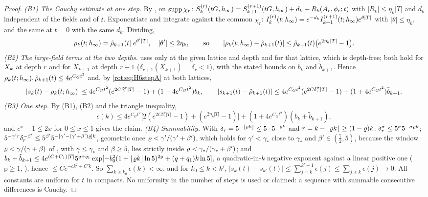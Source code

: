 \begin{proof}
\emph{(B1) The Cauchy estimate at one step.} By , on $\operatorname{supp}\chi_r$: $S^{(r)}_k(tG,h_\infty)=S^{(r+1)}_{k+1}(tG,h_\infty)+d_k+R_k(A_r,\phi_r;t)$ with $|R_k|\le\eta_k|T|$ and $d_k$ independent of the fields and of $t$. Exponentiate and integrate against the common $\chi_r$: $I^{(r)}_k(t;h_\infty)=e^{-d_k}I^{(r+1)}_{k+1}(t;h_\infty)e^{\theta|T|}$ with $|\theta|\le\eta_k$, and the same at $t=0$ with the same $d_k$. Dividing,
\[
\rho_k(t;h_\infty)=\tilde\rho_{k+1}(t)\,e^{\theta'|T|},\quad|\theta'|\le2\eta_k,\qquad\text{so}\qquad|\rho_k(t;h_\infty)-\tilde\rho_{k+1}(t)|\le\tilde\rho_{k+1}(t)\big(e^{2\eta_k|T|}-1\big).
\]
\emph{(B2) The large-field terms at the two depths.}  uses only  at the given lattice and depth and  for that lattice, which is depth-free; both hold for $X_k$ at depth $r$ and for $X_{k+1}$ at depth $r+1$ ($\delta_{r+1}(X_{k+1})=\delta_r<1$), with the stated bounds on $b_k$ and $\tilde b_{k+1}$. Hence $\rho_k(t;h_\infty),\tilde\rho_{k+1}(t)\le4e^{C_Gt^2}$ and, by \eqref{rot:eq:H6stepA} at both lattices,
\[
|s_k(t)-\rho_k(t;h_\infty)|\le4e^{C_Gt^2}(e^{2C\delta_r^\sigma|T|}-1)+(1+4e^{C_Gt^2})b_k,\qquad
|s_{k+1}(t)-\tilde\rho_{k+1}(t)|\le4e^{C_Gt^2}(e^{2C\delta_r^\sigma|T|}-1)+(1+4e^{C_Gt^2})\tilde b_{k+1}.
\]
\emph{(B3) One step.} By (B1), (B2) and the triangle inequality,
\[
\epsilon(k)\le4e^{C_Gt^2}\big[2(e^{2C\delta_r^\sigma|T|}-1)+(e^{2\eta_k|T|}-1)\big]+(1+4e^{C_Gt^2})(b_k+\tilde b_{k+1}),
\]
and $e^x-1\le2x$ for $0\le x\le1$ gives the claim.
\emph{(B4) Summability.} With $\delta_r=5^{-\lfloor\varrho k\rfloor}\le5\cdot5^{-\varrho k}$ and $r=k-\lfloor\varrho k\rfloor\ge(1-\varrho)k$: $\delta_r^{\sigma}\le5^\sigma5^{-\sigma\varrho k}$; $5^{-\gamma'r}\delta_r^{-\beta'}\le5^{\beta'}5^{-[\gamma'-(\gamma'+\beta')\varrho]k}$, geometric once $\varrho<\gamma'/(\gamma'+\beta')$, which holds for $\gamma'<\gamma_*$ close to $\gamma_*$ and $\beta'\in(\frac72,5)$, because the window $\varrho<\gamma/(\gamma+\beta)$ of , with $\gamma\le\gamma_*$ and $\beta\ge5$, lies strictly inside $\varrho<\gamma_*/(\gamma_*+\beta')$; and $b_k+\tilde b_{k+1}\le4e^{(C+C_1)|T|}5^{q+q_1}\exp[-b_0^2(1+\lfloor\varrho k\rfloor\ln5)^{2\mathrm p}+(q+q_1)k\ln5]$, a quadratic-in-$k$ negative exponent against a linear positive one ($\mathrm p\ge1$, ), hence $\le Ce^{-ck^2+C'k}$. So $\sum_{k\ge k_0}\epsilon(k)<\infty$, and for $k_0\le k<k'$, $|s_k(t)-s_{k'}(t)|\le\sum_{j=k}^{k'-1}\epsilon(j)\le\sum_{j\ge k}\epsilon(j)\to0$. All constants are uniform for $t$ in compacts. No uniformity in the number of steps is used or claimed: a sequence with summable consecutive differences is Cauchy.
\end{proof}

